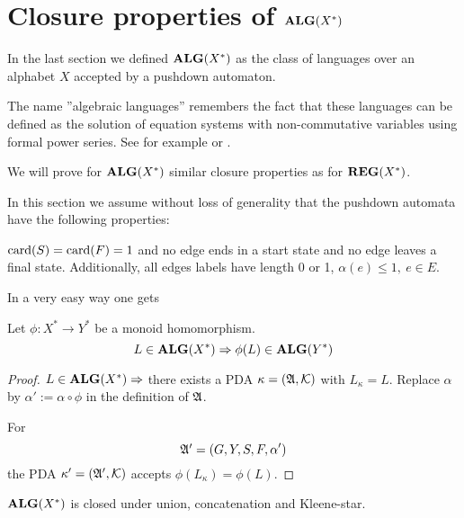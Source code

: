 \section{Closure properties of \texorpdfstring{$\mbox{{\bf ALG}}(X^*)$}{ALG(X*)}}

In the last section we defined $\mbox{{\bf ALG}}(X^*)$ as the class of languages over an
alphabet $X$ accepted by a pushdown automaton.

The name ''algebraic languages'' remembers the fact that these languages can be
defined as the solution of equation systems with non-commutative variables using
formal power series. See for example \cite{SaSo} or \cite{Berstel77}.

We will prove for $\mbox{{\bf ALG}}(X^*)$ similar closure properties as for $\mbox{{\bf REG}}(X^*)$.

In this section we assume without loss of generality that the pushdown automata
have the following properties:

$\mathrm{card}({S}) = \mathrm{card}({F}) = 1$ and no edge ends in a start state and no edge leaves a
final state. Additionally, all edges labels have length 0 or 1, $\alpha(e) \leq
1,\ e \in E$.

In a very easy way one gets

\begin{theorem}
\label{alg-lang-closure-hom}
Let $\phi : X^* \to Y^*$ be a monoid homomorphism.
\[ L \in \mbox{{\bf ALG}}(X^*) \Rightarrow \phi(L) \in \mbox{{\bf ALG}}(Y^*) \]
\end{theorem} 

\begin{proof}
$L \in \mbox{{\bf ALG}}(X^*) \Rightarrow$ there exists a PDA $\kappa = (\mbox{$\mathfrak{A}$}, \mbox{$\mathcal{K}$})$
with $L_{\kappa} = L$. Replace $\alpha$ by $\alpha' := \alpha \circ \phi$ in
the definition of $\mbox{$\mathfrak{A}$}$. 

For
\[ \mbox{$\mathfrak{A'}$} = (G, Y, S, F, \alpha') \]
the PDA $\kappa' = (\mbox{$\mathfrak{A'}$}, \mbox{$\mathcal{K}$})$ accepts $\phi(L_{\kappa}) = \phi(L)$.
\end{proof}

\bigskip
\begin{theorem}
$\mbox{{\bf ALG}}(X^*)$ is closed under union, concatenation and Kleene-star.
\end{theorem}

